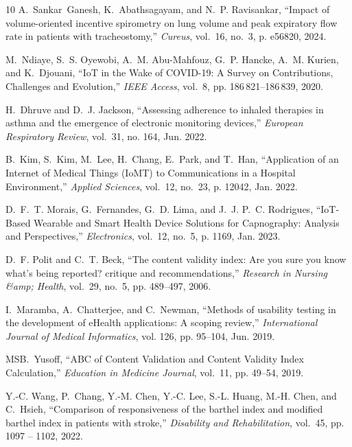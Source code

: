 \documentclass{ieeeaccess}
\begin{document}
{\begin{thebibliography}{10}
A.~Sankar~Ganesh, K.~Abathsagayam, and N.~P. Ravisankar, ``Impact of volume-oriented incentive spirometry on lung volume and peak expiratory flow rate in patients with tracheostomy,'' \emph{Cureus}, vol.~16, no.~3, p. e56820, 2024.

M.~Ndiaye, S.~S. Oyewobi, A.~M. {Abu-Mahfouz}, G.~P. Hancke, A.~M. Kurien, and K.~Djouani, ``{{IoT}} in the {{Wake}} of {{COVID-19}}: {{A Survey}} on {{Contributions}}, {{Challenges}} and {{Evolution}},'' \emph{IEEE Access}, vol.~8, pp. 186\,821--186\,839, 2020.

H.~Dhruve and D.~J. Jackson, ``Assessing adherence to inhaled therapies in asthma and the emergence of electronic monitoring devices,'' \emph{European Respiratory Review}, vol.~31, no. 164, Jun. 2022.

B.~Kim, S.~Kim, M.~Lee, H.~Chang, E.~Park, and T.~Han, ``Application of an {{Internet}} of {{Medical Things}} ({{IoMT}}) to {{Communications}} in a {{Hospital Environment}},'' \emph{Applied Sciences}, vol.~12, no.~23, p. 12042, Jan. 2022.

D.~F.~T. Morais, G.~Fernandes, G.~D. Lima, and J.~J. P.~C. Rodrigues, ``{{IoT-Based Wearable}} and {{Smart Health Device Solutions}} for {{Capnography}}: {{Analysis}} and {{Perspectives}},'' \emph{Electronics}, vol.~12, no.~5, p. 1169, Jan. 2023.

D.~F. Polit and C.~T. Beck, ``The content validity index: {{Are}} you sure you know what's being reported? critique and recommendations,'' \emph{Research in Nursing \&amp; Health}, vol.~29, no.~5, pp. 489--497, 2006.

I.~Maramba, A.~Chatterjee, and C.~Newman, ``Methods of usability testing in the development of {{eHealth}} applications: {{A}} scoping review,'' \emph{International Journal of Medical Informatics}, vol. 126, pp. 95--104, Jun. 2019.

{\relax MSB}.~Yusoff, ``{{ABC}} of {{Content Validation}} and {{Content Validity Index Calculation}},'' \emph{Education in Medicine Journal}, vol.~11, pp. 49--54, 2019.

Y.-C. Wang, P.~Chang, Y.-M. Chen, Y.-C. Lee, S.-L. Huang, M.-H. Chen, and C.~Hsieh, ``Comparison of responsiveness of the barthel index and modified barthel index in patients with stroke,'' \emph{Disability and Rehabilitation}, vol.~45, pp. 1097 -- 1102, 2022.


\end{thebibliography}}
\end{document}
